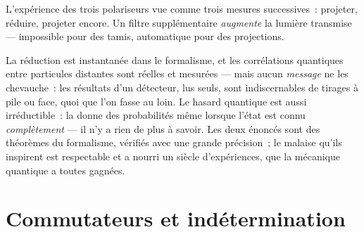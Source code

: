 \begin{omfigure}

{\small L'expérience des trois polariseurs vue comme trois mesures
successives~: projeter, réduire, projeter encore. Un filtre
supplémentaire \emph{augmente} la lumière transmise --- impossible
pour des tamis, automatique pour des projections.}
\end{omfigure}

\begin{remark}\label{rem:b3:quantum-formalism:nosignal}
La réduction est instantanée dans le formalisme, et les corrélations
quantiques entre particules distantes sont réelles et mesurées ---
mais aucun \emph{message} ne les chevauche~: les résultats d'un
détecteur, lus seuls, sont indiscernables de tirages à pile ou face,
quoi que l'on fasse au loin. Le hasard quantique est aussi
irréductible~: la  donne des probabilités même lorsque
l'état est connu \emph{complètement} --- il n'y a rien de plus à
savoir. Les deux énoncés sont des théorèmes du formalisme, vérifiés
avec une grande précision~; le malaise qu'ils inspirent est
respectable et a nourri un siècle d'expériences, que la mécanique
quantique a toutes gagnées.
\end{remark}

\section{Commutateurs et indétermination}

